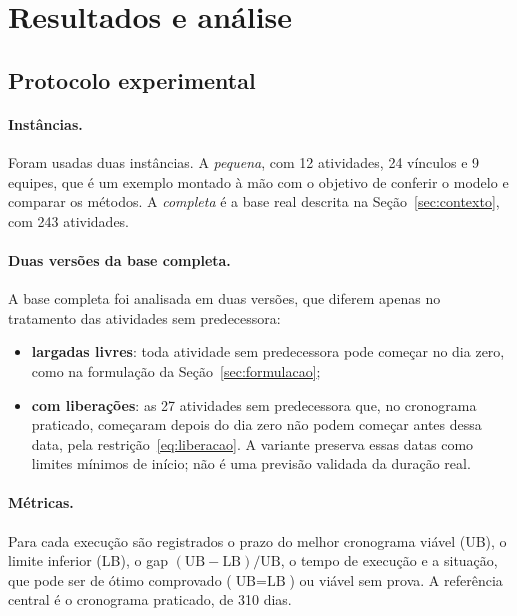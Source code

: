 
\section{Resultados e análise}
\label{sec:resultados}

\subsection{Protocolo experimental}
\label{sec:protocolo}

\paragraph{Instâncias.}
Foram usadas duas instâncias. A \emph{pequena}, com 12 atividades,
24 vínculos e 9 equipes, que é um exemplo montado à mão com o objetivo de conferir o modelo
e comparar os métodos. A \emph{completa} é a base real descrita na
Seção~\ref{sec:contexto}, com 243 atividades.

\paragraph{Duas versões da base completa.}
A base completa foi analisada em duas versões, que diferem apenas no
tratamento das atividades sem predecessora:
\begin{itemize}
  \item \textbf{largadas livres}: toda atividade sem predecessora pode
    começar no dia zero, como na formulação da
    Seção~\ref{sec:formulacao};
  \item \textbf{com liberações}: as 27 atividades sem predecessora que, no
    cronograma praticado, começaram depois do dia zero não podem começar
    antes dessa data, pela restrição~\eqref{eq:liberacao}. A variante
    preserva essas datas como limites mínimos de início; não é uma previsão
    validada da duração real.
\end{itemize}

\paragraph{Métricas.}
Para cada execução são registrados o prazo do melhor cronograma viável
(UB), o limite inferior (LB), o gap $(\text{UB}-\text{LB})/\text{UB}$, o
tempo de execução e a situação, que pode ser de ótimo comprovado ($\text{UB}=\text{LB}$)
ou viável sem prova. A referência central é o cronograma praticado, de 310 dias.

